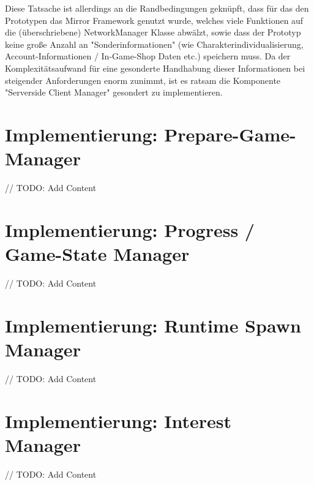 Diese Tatsache ist allerdings an die Randbedingungen geknüpft, dass für das den Prototypen das Mirror Framework genutzt wurde, welches viele Funktionen auf die (überschriebene) NetworkManager Klasse abwälzt, sowie dass der Prototyp keine große Anzahl an "Sonderinformationen" (wie Charakterindividualisierung, Account-Informationen / In-Game-Shop Daten etc.) speichern muss. Da der Komplexitätsaufwand für eine gesonderte Handhabung dieser Informationen bei steigender Anforderungen enorm zunimmt, ist es ratsam die Komponente "Serverside Client Manager" gesondert zu implementieren.

\section{Implementierung: Prepare-Game-Manager}

// TODO: Add Content

\section{Implementierung: Progress / Game-State Manager}
\label{Progress Manager}
// TODO: Add Content

\section{Implementierung: Runtime Spawn Manager}

// TODO: Add Content

\section{Implementierung: Interest Manager}

// TODO: Add Content










